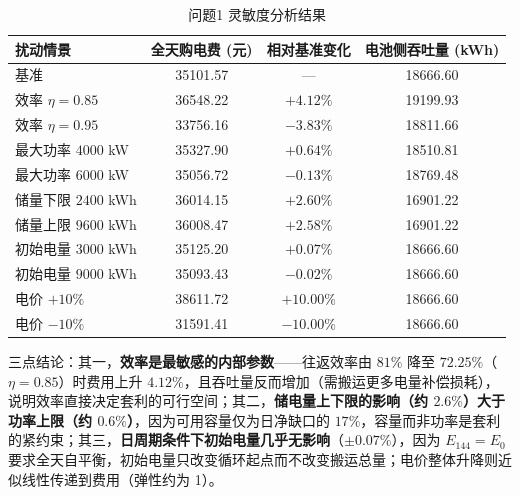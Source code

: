 \begin{table}[H]
  \centering
  \caption{问题1 灵敏度分析结果}
  \label{tab:p1-sens}
  \small
  \begin{tabular}{lccc}
    \toprule[1.5pt]
    扰动情景 & 全天购电费 (元) & 相对基准变化 & 电池侧吞吐量 (\si{kWh}) \\
    \midrule[1pt]
    基准                      & 35101.57 & ---       & 18666.60 \\
    效率 $\eta=0.85$          & 36548.22 & $+4.12\%$ & 19199.93 \\
    效率 $\eta=0.95$          & 33756.16 & $-3.83\%$ & 18811.66 \\
    最大功率 $4000$ \si{kW}   & 35327.90 & $+0.64\%$ & 18510.81 \\
    最大功率 $6000$ \si{kW}   & 35056.72 & $-0.13\%$ & 18769.48 \\
    储量下限 $2400$ \si{kWh}  & 36014.15 & $+2.60\%$ & 16901.22 \\
    储量上限 $9600$ \si{kWh}  & 36008.47 & $+2.58\%$ & 16901.22 \\
    初始电量 $3000$ \si{kWh}  & 35125.20 & $+0.07\%$ & 18666.60 \\
    初始电量 $9000$ \si{kWh}  & 35093.43 & $-0.02\%$ & 18666.60 \\
    电价 $+10\%$              & 38611.72 & $+10.00\%$ & 18666.60 \\
    电价 $-10\%$              & 31591.41 & $-10.00\%$ & 18666.60 \\
    \bottomrule[1.5pt]
  \end{tabular}
\end{table}

三点结论：其一，\textbf{效率是最敏感的内部参数}——往返效率由 $81\%$ 降至 $72.25\%$（$\eta=0.85$）时费用上升 $4.12\%$，且吞吐量反而增加（需搬运更多电量补偿损耗），说明效率直接决定套利的可行空间；其二，\textbf{储电量上下限的影响（约 $2.6\%$）大于功率上限（约 $0.6\%$）}，因为可用容量仅为日净缺口的 $17\%$，容量而非功率是套利的紧约束；其三，\textbf{日周期条件下初始电量几乎无影响}（$\pm0.07\%$），因为 $E_{144}=E_0$ 要求全天自平衡，初始电量只改变循环起点而不改变搬运总量；电价整体升降则近似线性传递到费用（弹性约为 1）。
